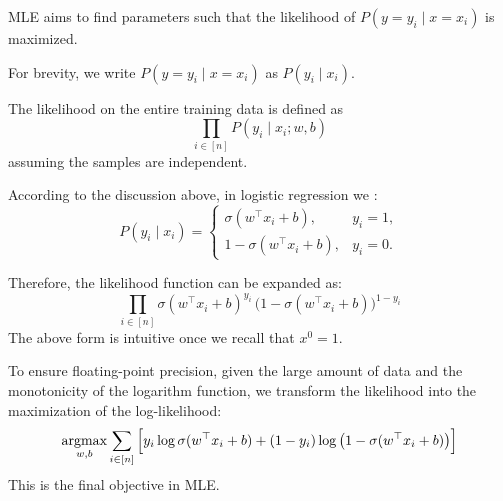 \documentclass[../main]{subfiles}
\begin{document}
\begin{definition}
    MLE aims to find parameters such that the likelihood of $P(y=y_i \mid x=x_i)$ is maximized.
\end{definition}

\begin{remark}
  For brevity, we write $P(y=y_i \mid x=x_i)$ as $P(y_i \mid x_i)$.
\end{remark}
\begin{definition}[Likelihood]
  The likelihood on the entire training data is defined as
  \begin{equation}
      \prod_{i \in [n]} P(y_i \mid x_i; w, b)
  \end{equation}
  assuming the samples are independent.
\end{definition}

According to the discussion above, in logistic regression we :
\begin{equation}
    P(y_i \mid x_i) =
    \begin{cases}
      \sigma(w^\top x_i + b), & y_i = 1, \\
      1 - \sigma(w^\top x_i + b), & y_i = 0.
    \end{cases}
\end{equation}

Therefore, the likelihood function can be expanded as:
\begin{equation}
  \prod_{i \in [n]} \sigma(w^\top x_i + b)^{y_i} \,
  \big(1 - \sigma(w^\top x_i + b)\big)^{1-y_i}
\end{equation}
The above form is intuitive once we recall that $x^0 = 1$.

To ensure floating-point precision, given the large amount of data and the monotonicity of the logarithm function, 
we transform the likelihood into the maximization of the log-likelihood:
\begin{equation}
    \mathop{\mathrm{argmax}}_{w,b} \sum_{i \in [n]} 
    \Big[ y_i \log \sigma(w^\top x_i + b) 
    + (1-y_i) \log \big(1 - \sigma(w^\top x_i + b)\big) \Big]
\end{equation}
This is the final objective in MLE.
\end{document}
